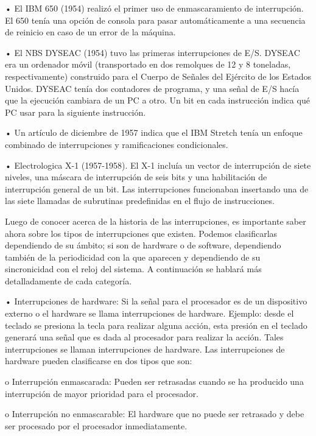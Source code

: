 \documentclass[12pt]{article}
\begin{document}
{•	El IBM 650 (1954) realizó el primer uso de enmascaramiento de interrupción. El 650 tenía una opción de consola para pasar automáticamente a una secuencia de reinicio en caso de un error de la máquina.

•	El NBS DYSEAC (1954) tuvo las primeras interrupciones de E/S. DYSEAC era un ordenador móvil (transportado en dos remolques de 12 y 8 toneladas, respectivamente) construido para el Cuerpo de Señales del Ejército de los Estados Unidos. DYSEAC tenía dos contadores de programa, y una señal de E/S hacía que la ejecución cambiara de un PC a otro. Un bit en cada instrucción indica qué PC usar para la siguiente instrucción.

•	Un artículo de diciembre de 1957 indica que el IBM Stretch tenía un enfoque combinado de interrupciones y ramificaciones condicionales.

•	Electrologica X-1 (1957-1958). El X-1 incluía un vector de interrupción de siete niveles, una máscara de interrupción de seis bits y una habilitación de interrupción general de un bit. Las interrupciones funcionaban insertando una de las siete llamadas de subrutinas predefinidas en el flujo de instrucciones. \citep{LambdaEcu}
\newline

Luego de conocer acerca de la historia de las interrupciones, es importante saber ahora sobre los tipos de interrupciones que existen. Podemos clasificarlas dependiendo de su ámbito; si son de hardware o de software, dependiendo también de la periodicidad con la que aparecen y dependiendo de su sincronicidad con el reloj del sistema. A continuación se hablará más detalladamente de cada categoría.
\newline

•	Interrupciones de hardware: Si la señal para el procesador es de un dispositivo externo o el hardware se llama interrupciones de hardware. Ejemplo: desde el teclado se presiona la tecla para realizar alguna acción, esta presión en el teclado generará una señal que es dada al procesador para realizar la acción. Tales interrupciones se llaman interrupciones de hardware. Las interrupciones de hardware pueden clasificarse en dos tipos que son:

\hspace{10mm}o	Interrupción enmascarada: Pueden ser retrasadas cuando se ha producido una interrupción de mayor prioridad para el procesador.
    
\hspace{10mm}o	Interrupción no enmascarable: El hardware que no puede ser retrasado y debe ser procesado por el procesador inmediatamente.
\newline

}
\end{document}
